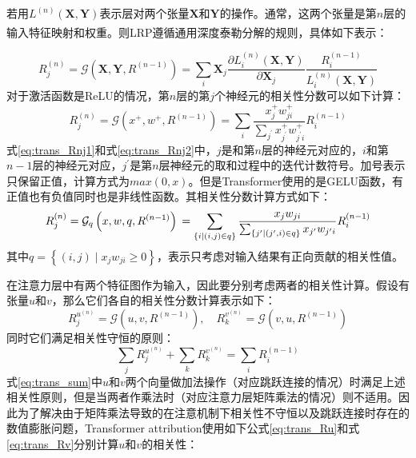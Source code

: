 若用$L^{(n)}(\mathbf{X},\mathbf{Y})$表示层对两个张量$\mathbf{X}$和$\mathbf{Y}$的操作。通常，这两个张量是第$n$层的输入特征映射和权重。则LRP遵循通用深度泰勒分解\textsuperscript{\cite{montavon2017explaining}}的规则，具体如下表示：

\begin{equation}
	R_{j}^{(n)} =\mathcal{G}\left(\mathbf{X}, \mathbf{Y}, R^{(n-1)}\right) =\sum_{i} \mathbf{X}_{j} \frac{\partial L_{i}^{(n)}(\mathbf{X}, \mathbf{Y})}{\partial \mathbf{X}_{j}} \frac{R_{i}^{(n-1)}}{L_{i}^{(n)}(\mathbf{X}, \mathbf{Y})}
	\label{eq:trans_Rnj1}
\end{equation}
对于激活函数是ReLU的情况，第$n$层的第$j$个神经元的相关性分数可以如下计算：
\begin{equation}
	R_{j}^{(n)}=\mathcal{G}\left(x^{+}, w^{+}, R^{(n-1)}\right)=\sum_{i} \frac{x_{j}^{+} w_{j i}^{+}}{\sum_{j^{\prime}} x_{j^{\prime}}^{+} w_{j^{\prime} i}^{+}} R_{i}^{(n-1)}
	\label{eq:trans_Rnj2}
\end{equation}
式\ref{eq:trans_Rnj1}和式\ref{eq:trans_Rnj2}中，$j$是和第$n$层的神经元对应的，$i$和第$n-1$层的神经元对应，$j^{\prime}$是第$n$层神经元的取和过程中的迭代计数符号。加号表示只保留正值，计算方式为$max(0,x)$。但是Transformer使用的是GELU函数，有正值也有负值同时也是非线性函数。其相关性分数计算方式如下：
\begin{equation}
	R_{j}^{(n)}  =\mathcal{G}_{q}\left(x, w, q, R^{(n-1)}\right) \\
	 =\sum_{\{i \mid(i, j) \in q\}} \frac{x_{j} w_{j i}}{\sum_{\{j^{\prime} \mid\left(j^{\prime}, i\right) \in q\}} x_{j^{\prime}} w_{j^{\prime} i}} R_{i}^{(n-1)}
\end{equation}
其中$q=\left\{(i, j) \mid x_{j} w_{j i} \geq 0\right\}$，表示只考虑对输入结果有正向贡献的相关性值。

在注意力层中有两个特征图作为输入，因此要分别考虑两者的相关性计算。假设有张量$u$和$v$，那么它们各自的相关性分数计算表示如下：
\begin{equation}
	R_{j}^{u^{(n)}}=\mathcal{G}\left(u, v, R^{(n-1)}\right), \quad R_{k}^{v^{(n)}}=\mathcal{G}\left(v, u, R^{(n-1)}\right)
\end{equation}
同时它们满足相关性守恒的原则：
\begin{equation}
	\sum_j R_{j}^{u^{(n)}}+ \sum_k R_{k}^{v^{(n)}}=\sum_i R_{i}^{(n-1)}
	\label{eq:trans_sum}
\end{equation}
式\ref{eq:trans_sum}中$u$和$v$两个向量做加法操作（对应跳跃连接的情况）时满足上述相关性原则，但是当两者作乘法时（对应注意力层矩阵乘法的情况）则不适用。因此为了解决由于矩阵乘法导致的在注意机制下相关性不守恒以及跳跃连接时存在的数值膨胀问题，Transformer attribution使用如下公式\ref{eq:trans_Ru}和式\ref{eq:trans_Rv}分别计算$u$和$v$的相关性：

